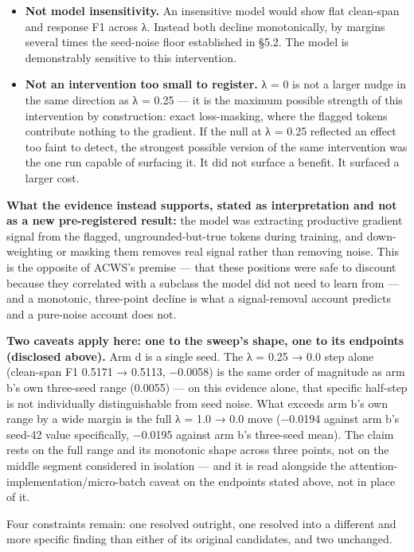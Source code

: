 \documentclass[11pt]{article}
\providecommand{\tightlist}{\setlength{\itemsep}{0pt}\setlength{\parskip}{0pt}}
\begin{document}
\begin{itemize}
\tightlist
\item
  \textbf{Not model insensitivity.} An insensitive model would show flat clean-span and response
  F1 across λ. Instead both decline monotonically, by margins several times the seed-noise
  floor established in §5.2. The model is demonstrably sensitive to this intervention.
\item
  \textbf{Not an intervention too small to register.} λ = 0 is not a larger nudge in the same
  direction as λ = 0.25 --- it is the maximum possible strength of this intervention by
  construction: exact loss-masking, where the flagged tokens contribute nothing to the
  gradient. If the null at λ = 0.25 reflected an effect too faint to detect, the strongest
  possible version of the same intervention was the one run capable of surfacing it. It did
  not surface a benefit. It surfaced a larger cost.
\end{itemize}

\textbf{What the evidence instead supports, stated as interpretation and not as a new
pre-registered result:} the model was extracting productive gradient signal from the
flagged, ungrounded-but-true tokens during training, and down-weighting or masking them
removes real signal rather than removing noise. This is the opposite of ACWS's premise ---
that these positions were safe to discount because they correlated with a subclass the model
did not need to learn from --- and a monotonic, three-point decline is what a signal-removal
account predicts and a pure-noise account does not.

\textbf{Two caveats apply here: one to the sweep's shape, one to its endpoints (disclosed above).}
Arm d is a single seed. The λ = 0.25 → 0.0 step alone (clean-span F1 0.5171 → 0.5113, −0.0058)
is the same order of magnitude as arm b's own three-seed range (0.0055) --- on this evidence
alone, that specific half-step is not individually distinguishable from seed noise. What
exceeds arm b's own range by a wide margin is the full λ = 1.0 → 0.0 move (−0.0194 against
arm b's seed-42 value specifically, −0.0195 against arm b's three-seed mean). The claim rests
on the full range and its monotonic shape across three points, not on the middle segment
considered in isolation --- and it is read alongside the attention-implementation/micro-batch
caveat on the endpoints stated above, not in place of it.

Four constraints remain: one resolved outright, one resolved into a different and more
specific finding than either of its original candidates, and two unchanged.
\end{document}
